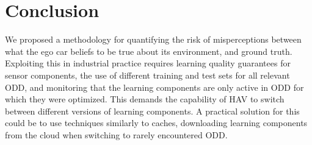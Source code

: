 \section{Conclusion}
%
We proposed a methodology for quantifying the risk of misperceptions between what the ego car beliefs to be true about its environment, and ground truth. Exploiting this in industrial practice requires learning quality guarantees for sensor components, the use of different training and test sets for all relevant ODD, and monitoring that the learning components are only active in ODD for which they were optimized. This demands the capability of HAV to  switch between different versions of learning components. A practical solution for this could be to use techniques similarly to caches, downloading learning components from the cloud when switching to rarely encountered ODD.